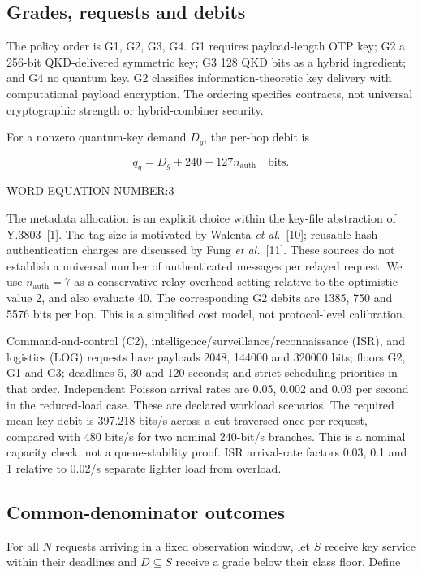 \documentclass[conference,a4paper]{IEEEtran}
\begin{document}
\subsection{Grades, requests and debits}
The policy order is G1, G2, G3, G4. G1 requires payload-length OTP key; G2 a 256-bit QKD-delivered symmetric key; G3 128 QKD bits as a hybrid ingredient; and G4 no quantum key. G2 classifies information-theoretic key delivery with computational payload encryption. The ordering specifies contracts, not universal cryptographic strength or hybrid-combiner security.

For a nonzero quantum-key demand $D_g$, the per-hop debit is


\[
q_g=D_g+240+127n_{\mathrm{auth}}\quad\text{bits}.
\]

WORD-EQUATION-NUMBER:3


The metadata allocation is an explicit choice within the key-file abstraction of Y.3803~[1]. The tag size is motivated by Walenta \emph{et al.}~[10]; reusable-hash authentication charges are discussed by Fung \emph{et al.}~[11]. These sources do not establish a universal number of authenticated messages per relayed request. We use $n_{\mathrm{auth}}=7$ as a conservative relay-overhead setting relative to the optimistic value 2, and also evaluate 40. The corresponding G2 debits are 1385, 750 and 5576 bits per hop. This is a simplified cost model, not protocol-level calibration.

Command-and-control (C2), intelligence/surveillance/reconnaissance (ISR), and logistics (LOG) requests have payloads 2048, 144000 and 320000 bits; floors G2, G1 and G3; deadlines 5, 30 and 120 seconds; and strict scheduling priorities in that order. Independent Poisson arrival rates are 0.05, 0.002 and 0.03 per second in the reduced-load case. These are declared workload scenarios. The required mean key debit is 397.218 bits/s across a cut traversed once per request, compared with 480 bits/s for two nominal 240-bit/s branches. This is a nominal capacity check, not a queue-stability proof. ISR arrival-rate factors 0.03, 0.1 and 1 relative to 0.02/s separate lighter load from overload.

\subsection{Common-denominator outcomes}\label{sec:metrics}
For all $N$ requests arriving in a fixed observation window, let $S$ receive key service within their deadlines and $D\subseteq S$ receive a grade below their class floor. Define
\end{document}
